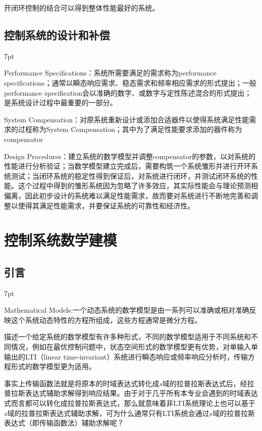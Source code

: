 \documentclass{article}
\numberwithin{equation}{section}
\numberwithin{figure}{section}
\newenvironment{formal}{%
\def\FrameCommand{%
\hspace{1pt}%
{\color{DarkBlue}\vrule width 2pt}%
{\color{formalshade}\vrule width 4pt}%
\colorbox{formalshade}%
}%
\MakeFramed{\advance\hsize-\width\FrameRestore}%
\noindent\hspace{-4.55pt}%
\begin{adjustwidth}{}{7pt}%
\vspace{2pt}\vspace{2pt}%
}
{%
\vspace{2pt}\end{adjustwidth}\endMakeFramed%
}
\begin{document}
开闭环控制的结合可以得到整体性能最好的系统。

\subsection{控制系统的设计和补偿}
\begin{formal}
    \item Performance Specifications：系统所需要满足的需求称为performance specifications；通常以瞬态响应需求、稳态需求和频率相应需求的形式提出；一般performance specification会以准确的数字、或数字与定性陈述混合的形式提出；是系统设计过程中最重要的一部分。
    \item System Compensation：对原系统重新设计或添加合适器件以使得系统满足性能需求的过程称为System Compensation；其中为了满足性能要求添加的器件称为compensator
    \item Design Procedures：建立系统的数学模型并调整compensator的参数，以对系统的性能进行分析验证；当数学模型建立完成后，需要构筑一个系统雏形并进行开环系统测试；当闭环系统的稳定性得到保证后，对系统进行闭环，并测试闭环系统的性能。这个过程中得到的雏形系统因为忽略了许多效应，其实际性能会与理论预测相偏离，因此初步设计的系统难以满足性能需求，故而要对系统进行不断地完善和调整以使得其满足性能需求，并要保证系统的可靠性和经济性。
    \item 
\end{formal}
\section{控制系统数学建模}
\subsection{引言}
\begin{formal}
    Mathematical Models:一个动态系统的数学模型是由一系列可以准确或相对准确反映这个系统动态特性的方程所组成，这些方程通常是微分方程。
\end{formal}
描述一个给定系统的数学模型有许多种形式，不同的数学模型适用于不同系统和不同情况，例如在最优控制问题中，状态空间形式的数学模型更有优势，对单输入单输出的LTI（linear time-invariant）系统进行瞬态响应或频率响应分析时，传输方程形式的数学模型更为适用。

事实上传输函数法就是将原本的时域表达式转化成$s$域的拉普拉斯表达式后，经拉普拉斯表达式辅助求解得到响应结果。由于对于几乎所有本专业会遇到的时域表达式而言都可以转化成拉普拉斯表达式，那么就意味着非LTI系统理论上也可以基于$s$域的拉普拉斯表达式辅助求解，可为什么通常只有LTI系统会通过$s$域的拉普拉斯表达式（即传输函数法）辅助求解呢？
\end{document}
